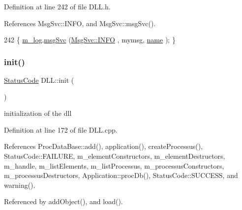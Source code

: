 Definition at line 242 of file D\+L\+L.\+h.



References Msg\+Svc\+::\+I\+N\+FO, and Msg\+Svc\+::msg\+Svc().


\begin{DoxyCode}
242 \{ \hyperlink{classDLL_a6e66cd993e2d142b48691557ce8e4047}{m\_log}.\hyperlink{classMsgSvc_ad25f18047920cc59a314e5098259711c}{msgSvc} (\hyperlink{classMsgSvc_ae671eb7301996cd049d2da8a65925926ad2fcf3f3e734fc41ee097cc23670ce51}{MsgSvc::INFO}    , mymsg, \hyperlink{classDLL_a0a915d538771dde2cb0580cd340ee088}{name} ); \}
\end{DoxyCode}
\mbox{\label{classDLL_ad2a4ae95995c0fa312ae31169df12d72}} 
\subsubsection{\texorpdfstring{init()}{init()}}
{\footnotesize\ttfamily \hyperlink{classStatusCode}{Status\+Code} D\+L\+L\+::init (\begin{DoxyParamCaption}{ }\end{DoxyParamCaption})}

initialization of the dll 

Definition at line 172 of file D\+L\+L.\+cpp.



References Proc\+Data\+Base\+::add(), application(), create\+Processus(), Status\+Code\+::\+F\+A\+I\+L\+U\+RE, m\+\_\+element\+Constructors, m\+\_\+element\+Destructors, m\+\_\+handle, m\+\_\+list\+Elements, m\+\_\+list\+Processus, m\+\_\+processus\+Constructors, m\+\_\+processus\+Destructors, Application\+::proc\+Db(), Status\+Code\+::\+S\+U\+C\+C\+E\+SS, and warning().



Referenced by add\+Object(), and load().


